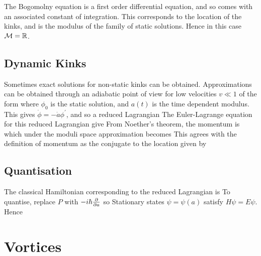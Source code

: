 \documentclass{article}
\begin{document}
\begin{prop}
The Bogomolny equation is a first order differential equation, and so comes with an associated constant of integration. This corresponds to the location of the kinks, and is the modulus of the family of static solutions. Hence in this case $\mathcal{M} = \mathbb{R}$. 
\end{prop}
\subsection{Dynamic Kinks}
Sometimes exact solutions for non-static kinks can be obtained. Approximations can be obtained through an adiabatic point of view for low velocities $v \ll 1$ of the form 
where $\phi_0$ is the static solution, and $a(t)$ is the time dependent modulus. This gives $\dot{\phi} = -\dot{a}\phi^\prime$, and so a reduced Lagrangian 
The Euler-Lagrange equation for this reduced Lagrangian give
From Noether's theorem, the momentum is 
which under the moduli space approximation becomes 
This agrees with the definition of momentum as the conjugate to the location given by 
\subsection{Quantisation}

The classical Hamiltonian corresponding to the reduced Lagrangian is 
To quantise, replace $P$ with $-i\hbar \frac{\partial}{\partial a}$ so 
Stationary states $\psi = \psi(a)$ satisfy $H\psi = E\psi$. Hence 
\section{Vortices}
\end{document}
